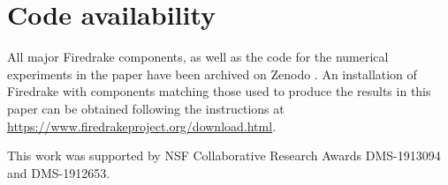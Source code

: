 \documentclass[format=acmsmall,screen,timestamp=false,a4paper]{acmart}
\newcommand\josh[1]{\textbf{\textcolor[rgb]{0,.5,1}{[Josh: #1]}}}
\begin{document}

\section*{Code availability}

All major Firedrake components, as well as the code for the numerical experiments in the paper have been archived on Zenodo \cite{zenodo/2021}. An installation of Firedrake with components matching those used to produce the results in this paper can be obtained following the instructions at \url{https://www.firedrakeproject.org/download.html}.

\begin{acks}
This work was supported by NSF Collaborative Research Awards DMS-1913094 and DMS-1912653.
    
  
\end{acks}



    

\end{document}
